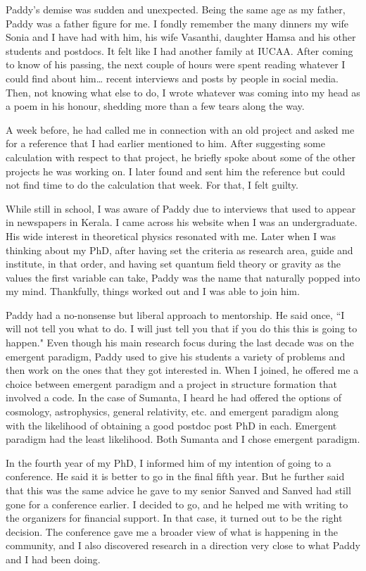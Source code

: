 \documentclass[prd, preprint, longbibliography, 11pt]{revtex4-1}
\begin{document}
\medskip

\noindent Paddy's demise was sudden and unexpected. Being the same age as my father, Paddy was a father figure for me. I fondly remember the many dinners my wife Sonia and I have had with him, his wife Vasanthi, daughter Hamsa and his other students and postdocs. It felt like I had another family at IUCAA. After coming to know of his passing, the next couple of hours were spent reading whatever I could find about him… recent interviews and posts by people in social media. Then, not knowing what else to do, I wrote whatever was coming into my head as a poem in his honour, shedding more than a few tears along the way.

A week before, he had called me in connection with an old project and asked me for a reference that I had earlier mentioned to him.  After suggesting some calculation with respect to that project, he briefly spoke about some of the other projects he was working on. I later found and sent him the reference but could not find time to do the calculation that week. For that, I felt guilty.

While still in school, I was aware of Paddy due to interviews that used to appear in newspapers in Kerala. I came across his website when I was an undergraduate. His wide interest in theoretical physics resonated with me. Later when I was thinking about my PhD, after having set the criteria as research area, guide and institute, in that order, and having set quantum field theory or gravity as the values the first variable can take, Paddy was the name that naturally popped into my mind. Thankfully, things worked out and I was able to join him.

Paddy had a no-nonsense but liberal approach to mentorship. He said once, ``I will not tell you what to do. I will just tell you that if you do this this is going to happen."  Even though his main research focus during the last decade was on the emergent paradigm, Paddy used to give his students a variety of problems and then work on the ones that they got interested in. When I joined, he offered me a choice between emergent paradigm and a project in structure formation that involved a code. In the case of Sumanta, I heard he had offered the options of cosmology, astrophysics, general relativity, etc. and emergent paradigm along with the likelihood of obtaining a good postdoc post PhD in each. Emergent paradigm had the least likelihood. Both Sumanta and I chose emergent paradigm. 

In the fourth year of my PhD, I informed him of my intention of going to a conference. He said it is better to go in the final fifth year. But he further said that this was the same advice he gave to my senior Sanved and Sanved had still gone for a conference earlier. I decided to go, and he helped me with writing to the organizers for financial support. In that case, it turned out to be the right decision. The conference gave me a broader view of what is happening in the community, and I also discovered research in a direction very close to what Paddy and I had been doing.
\end{document}
